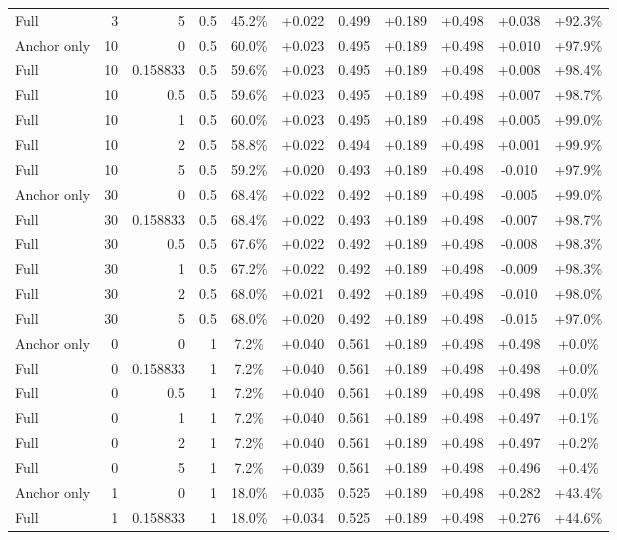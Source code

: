 \begin{table}[htbp]
\begin{tabular}{lrrrccccccc}
Full & 3 & 5 & 0.5 & 45.2\% & +0.022 & 0.499 & +0.189 & +0.498 & +0.038 & +92.3\% \\
Anchor only & 10 & 0 & 0.5 & 60.0\% & +0.023 & 0.495 & +0.189 & +0.498 & +0.010 & +97.9\% \\
Full & 10 & 0.158833 & 0.5 & 59.6\% & +0.023 & 0.495 & +0.189 & +0.498 & +0.008 & +98.4\% \\
Full & 10 & 0.5 & 0.5 & 59.6\% & +0.023 & 0.495 & +0.189 & +0.498 & +0.007 & +98.7\% \\
Full & 10 & 1 & 0.5 & 60.0\% & +0.023 & 0.495 & +0.189 & +0.498 & +0.005 & +99.0\% \\
Full & 10 & 2 & 0.5 & 58.8\% & +0.022 & 0.494 & +0.189 & +0.498 & +0.001 & +99.9\% \\
Full & 10 & 5 & 0.5 & 59.2\% & +0.020 & 0.493 & +0.189 & +0.498 & -0.010 & +97.9\% \\
Anchor only & 30 & 0 & 0.5 & 68.4\% & +0.022 & 0.492 & +0.189 & +0.498 & -0.005 & +99.0\% \\
Full & 30 & 0.158833 & 0.5 & 68.4\% & +0.022 & 0.493 & +0.189 & +0.498 & -0.007 & +98.7\% \\
Full & 30 & 0.5 & 0.5 & 67.6\% & +0.022 & 0.492 & +0.189 & +0.498 & -0.008 & +98.3\% \\
Full & 30 & 1 & 0.5 & 67.2\% & +0.022 & 0.492 & +0.189 & +0.498 & -0.009 & +98.3\% \\
Full & 30 & 2 & 0.5 & 68.0\% & +0.021 & 0.492 & +0.189 & +0.498 & -0.010 & +98.0\% \\
Full & 30 & 5 & 0.5 & 68.0\% & +0.020 & 0.492 & +0.189 & +0.498 & -0.015 & +97.0\% \\
Anchor only & 0 & 0 & 1 & 7.2\% & +0.040 & 0.561 & +0.189 & +0.498 & +0.498 & +0.0\% \\
Full & 0 & 0.158833 & 1 & 7.2\% & +0.040 & 0.561 & +0.189 & +0.498 & +0.498 & +0.0\% \\
Full & 0 & 0.5 & 1 & 7.2\% & +0.040 & 0.561 & +0.189 & +0.498 & +0.498 & +0.0\% \\
Full & 0 & 1 & 1 & 7.2\% & +0.040 & 0.561 & +0.189 & +0.498 & +0.497 & +0.1\% \\
Full & 0 & 2 & 1 & 7.2\% & +0.040 & 0.561 & +0.189 & +0.498 & +0.497 & +0.2\% \\
Full & 0 & 5 & 1 & 7.2\% & +0.039 & 0.561 & +0.189 & +0.498 & +0.496 & +0.4\% \\
Anchor only & 1 & 0 & 1 & 18.0\% & +0.035 & 0.525 & +0.189 & +0.498 & +0.282 & +43.4\% \\
Full & 1 & 0.158833 & 1 & 18.0\% & +0.034 & 0.525 & +0.189 & +0.498 & +0.276 & +44.6\% \\

\end{tabular}
\end{table}
